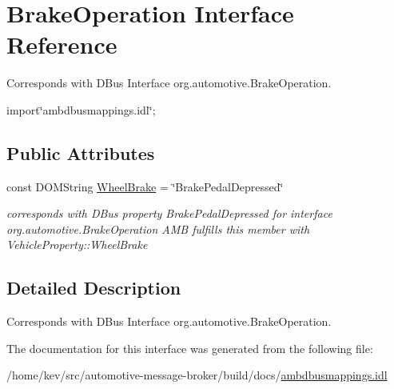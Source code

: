 \hypertarget{interfaceBrakeOperation}{\section{Brake\+Operation Interface Reference}
\label{interfaceBrakeOperation}
}


Corresponds with D\+Bus Interface org.\+automotive.\+Brake\+Operation.  




{\ttfamily import\char`\"{}ambdbusmappings.\+idl\char`\"{};}

\subsection*{Public Attributes}
\begin{DoxyCompactItemize}
\item 
\hypertarget{interfaceBrakeOperation_ad73cf8b7d7f23278303ecdbeaeb7a62b}{const D\+O\+M\+String \hyperlink{interfaceBrakeOperation_ad73cf8b7d7f23278303ecdbeaeb7a62b}{Wheel\+Brake} = \char`\"{}Brake\+Pedal\+Depressed\char`\"{}}\label{interfaceBrakeOperation_ad73cf8b7d7f23278303ecdbeaeb7a62b}

\begin{DoxyCompactList}\small\item\em corresponds with D\+Bus property Brake\+Pedal\+Depressed for interface org.\+automotive.\+Brake\+Operation A\+M\+B fulfills this member with Vehicle\+Property\+::\+Wheel\+Brake \end{DoxyCompactList}\end{DoxyCompactItemize}


\subsection{Detailed Description}
Corresponds with D\+Bus Interface org.\+automotive.\+Brake\+Operation. 

The documentation for this interface was generated from the following file\+:\begin{DoxyCompactItemize}
\item 
/home/kev/src/automotive-\/message-\/broker/build/docs/\hyperlink{ambdbusmappings_8idl}{ambdbusmappings.\+idl}\end{DoxyCompactItemize}
